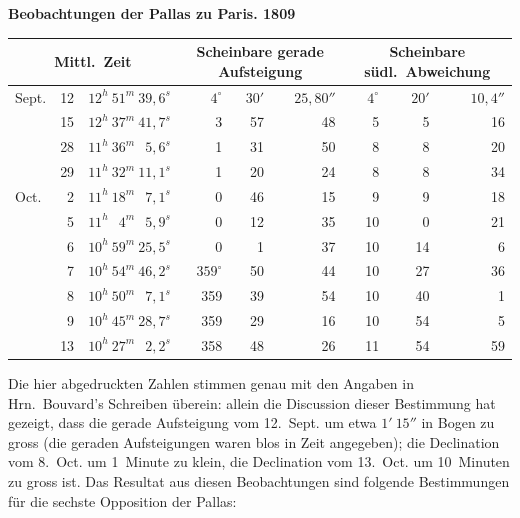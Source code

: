 \documentclass[12pt,a4paper]{book}
\begin{document}
\textbf{Beobachtungen der Pallas zu Paris. 1809}

\begin{small}
\begin{center}
\begin{tabular}{llr@{\hspace{1.5em}}rrr@{\hspace{1.5em}}rrr}
\toprule
\multicolumn{3}{c}{Mittl.~Zeit} & \multicolumn{3}{c}{Scheinbare gerade Aufsteigung} & \multicolumn{3}{c}{Scheinbare s\"udl.~Abweichung} \\
\midrule
Sept. & 12 & $12^{h}\ 51^{m}\ 39{,}6^{s}$ & $4^{\circ}$ & $30'$ & $25{,}80''$ & $4^{\circ}$ & $20'$ & $10{,}4''$ \\
& 15 & $12^{h}\ 37^{m}\ 41{,}7^{s}$ & \phantom{0}3 & 57 & 48 & 5 & 5 & 16 \\
& 28 & $11^{h}\ 36^{m}\ \phantom{0}5{,}6^{s}$ & \phantom{0}1 & 31 & 50 & 8 & 8 & 20 \\
& 29 & $11^{h}\ 32^{m}\ 11{,}1^{s}$ & \phantom{0}1 & 20 & 24 & 8 & 8 & 34 \\
Oct. & ~2 & $11^{h}\ 18^{m}\ \phantom{0}7{,}1^{s}$ & \phantom{0}0 & 46 & 15 & 9 & 9 & 18 \\
& ~5 & $11^{h}\ \phantom{0}4^{m}\ \phantom{0}5{,}9^{s}$ & \phantom{0}0 & 12 & 35 & 10 & \phantom{0}0 & 21 \\
& ~6 & $10^{h}\ 59^{m}\ 25{,}5^{s}$ & \phantom{0}0 & \phantom{1}1 & 37 & 10 & 14 & \phantom{0}6 \\
& ~7 & $10^{h}\ 54^{m}\ 46{,}2^{s}$ & $359^{\circ}$ & 50 & 44 & 10 & 27 & 36 \\
& ~8 & $10^{h}\ 50^{m}\ \phantom{0}7{,}1^{s}$ & 359 & 39 & 54 & 10 & 40 & \phantom{0}1 \\
& ~9 & $10^{h}\ 45^{m}\ 28{,}7^{s}$ & 359 & 29 & 16 & 10 & 54 & \phantom{0}5 \\
& 13 & $10^{h}\ 27^{m}\ \phantom{0}2{,}2^{s}$ & 358 & 48 & 26 & 11 & 54 & 59 \\
\bottomrule
\end{tabular}
\end{center}
\end{small}

Die hier abgedruckten Zahlen stimmen genau mit den Angaben in Hrn.~Bouvard's Schreiben \"uberein: allein die Discussion dieser Bestimmung hat gezeigt, dass die gerade Aufsteigung vom 12.~Sept. um etwa $1'\ 15''$ in Bogen zu gross (die geraden Aufsteigungen waren blos in Zeit angegeben); die Declination vom 8.~Oct. um 1~Minute zu klein, die Declination vom 13.~Oct. um 10~Minuten zu gross ist. Das Resultat aus diesen Beobachtungen sind folgende Bestimmungen f\"ur die sechste Opposition der Pallas:
\end{document}
